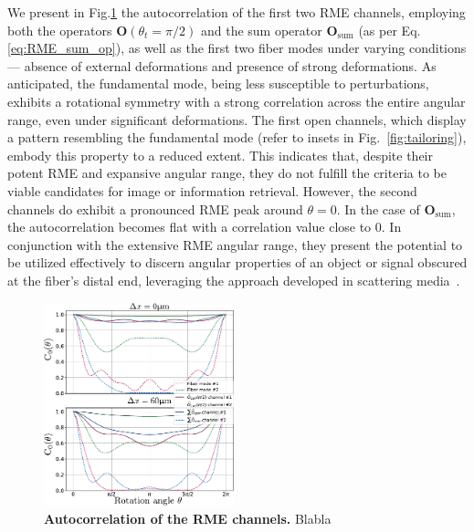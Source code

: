 \documentclass[aps,prl,twocolumn, amsmath,amssymb,superscriptaddress]{revtex4-2}
\begin{document}
We present in Fig.\ref{fig:autocorr} the autocorrelation of the first two RME channels, 
employing both the operators $\mathbf{O}(\theta_t= \pi/2)$ and the sum operator $\mathbf{O}_\text{sum}$ 
(as per Eq.\ref{eq:RME_sum_op}), 
as well as the first two fiber modes under varying conditions 
— absence of external deformations and presence of strong deformations. 
As anticipated, the fundamental mode, being less susceptible to perturbations, 
exhibits a rotational symmetry with a strong correlation across the entire angular range, 
even under significant deformations. 
The first open channels, 
which display a pattern resembling the fundamental mode 
(refer to insets in Fig.~\ref{fig:tailoring}), 
embody this property to a reduced extent.
This indicates that, despite their potent RME and expansive angular range, 
they do not fulfill the criteria to be viable candidates for image or information retrieval. 
However, the second channels do exhibit a pronounced RME peak around $\theta = 0$. 
In the case of $\mathbf{O}_\text{sum}$, the autocorrelation becomes flat with a correlation value close to 0. 
In conjunction with the extensive RME angular range, 
they present the potential to be utilized effectively to discern angular properties of an object 
or signal obscured at the fiber's distal end, 
leveraging the approach developed in scattering media~\cite{bertolotti2012non-invasive}.



\begin{figure}[ht]
\includegraphics[width=0.49\textwidth]{images/Fig_F_C0.pdf}
\caption{
\textbf{Autocorrelation of the RME channels.}
Blabla
}
\label{fig:autocorr}
\end{figure}

\end{document}
